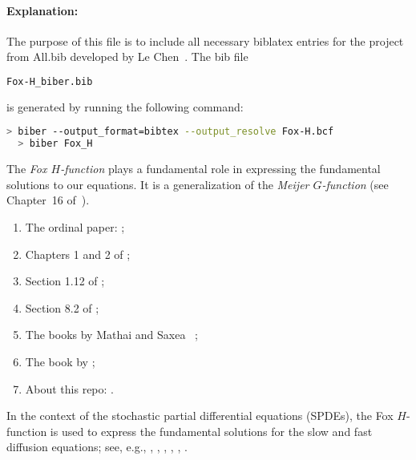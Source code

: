 \documentclass{article}
\begin{document}
\paragraph{Explanation:}


The purpose of this file is to include all necessary biblatex entries  for the
project  from All.bib developed by Le Chen~\cite{chen:23:spdes-bib}. The bib
file

\begin{lstlisting}[language=bash]
   Fox-H_biber.bib
\end{lstlisting}

is generated by running the following command:

\begin{lstlisting}[language=bash]
  > biber --output_format=bibtex --output_resolve Fox-H.bcf
  > biber Fox_H
\end{lstlisting}

The \textit{Fox $H$-function} plays a fundamental role in expressing the
fundamental solutions to our equations. It is a generalization of the
\textit{Meijer $G$-function} (see Chapter~16 of~\cite{olver.lozier.ea:10:nist}). 

\begin{enumerate}
  \item The ordinal paper: \cite{fox:61:g};
  \item Chapters 1 and 2 of \cite{kilbas.saigo:04:h-transforms};
  \item Section 1.12 of \cite{kilbas.srivastava.ea:06:theory};
  \item Section 8.2 of \cite{prudnikov.brychkov.ea:90:integrals};
  \item The books by Mathai and Saxea ~\cite{mathai.saxena.ea:10:h-function,
    mathai.saxena:78:h-function};
  \item The book by \cite{eidelman.ivasyshen.ea:04:analytic};
  \item About this repo: \cite{chen.hu:23:some}.
\end{enumerate}

In the context of the stochastic partial differential equations (SPDEs), the Fox
$H$-function is used to express the fundamental solutions for the slow and fast
diffusion equations; see, e.g., \cite{chen.hu.ea:17:space-time},
\cite{chen.hu.ea:19:nonlinear}, \cite{chen.eisenberg:22:interpolating},
\cite{chen.hu:22:holder}, \cite{chen.guo.ea:22:moments},
\cite{mijena.nane:15:space-time}.

\printbibliography[title={References}]
\end{document}
